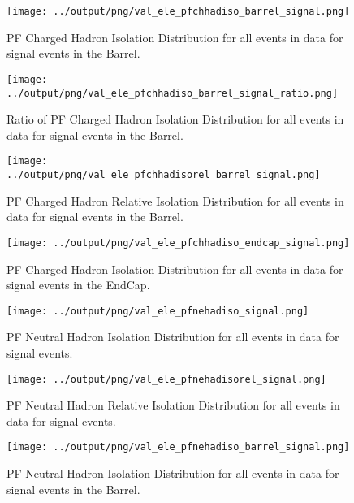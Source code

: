 \documentclass[11pt]{book}
\begin{document}
\begin{figure}[htb]
\centering
\texttt{[image: ../output/png/val\_ele\_pfchhadiso\_barrel\_signal.png]}
\caption{PF Charged Hadron Isolation Distribution for all events in data for signal events in the Barrel.}
\label{fig:val_ele_pfchhadiso_barrel_signal}
\end{figure}

\begin{figure}[htb]
\centering
\texttt{[image: ../output/png/val\_ele\_pfchhadiso\_barrel\_signal\_ratio.png]}
\caption{Ratio of PF Charged Hadron Isolation Distribution for all events in data for signal events in the Barrel.}
\label{fig:val_ele_pfchhadiso_barrel_signal_ratio}
\end{figure}


\begin{figure}[htb]
\centering
\texttt{[image: ../output/png/val\_ele\_pfchhadisorel\_barrel\_signal.png]}
\caption{PF Charged Hadron Relative Isolation Distribution for all events in data for signal events in the Barrel.}
\label{fig:val_ele_pfchhadisorel_barrel_signal}
\end{figure}

\begin{figure}[htb]
\centering
\texttt{[image: ../output/png/val\_ele\_pfchhadiso\_endcap\_signal.png]}
\caption{PF Charged Hadron Isolation Distribution for all events in data for signal events in the EndCap.}
\label{fig:val_ele_pfchhadiso_endcap_signal}
\end{figure}


\begin{figure}[htb]
\centering
\texttt{[image: ../output/png/val\_ele\_pfnehadiso\_signal.png]}
\caption{PF Neutral Hadron Isolation Distribution for all events in data for signal events.}
\label{fig:val_ele_pfnehadiso_signal}
\end{figure}

\begin{figure}[htb]
\centering
\texttt{[image: ../output/png/val\_ele\_pfnehadisorel\_signal.png]}
\caption{PF Neutral Hadron Relative Isolation Distribution for all events in data for signal events.}
\label{fig:val_ele_pfnehadisorel_signal}
\end{figure}

\begin{figure}[htb]
\centering
\texttt{[image: ../output/png/val\_ele\_pfnehadiso\_barrel\_signal.png]}
\caption{PF Neutral Hadron Isolation Distribution for all events in data for signal events in the Barrel.}
\label{fig:val_ele_pfnehadiso_barrel_signal}
\end{figure}
\end{document}

